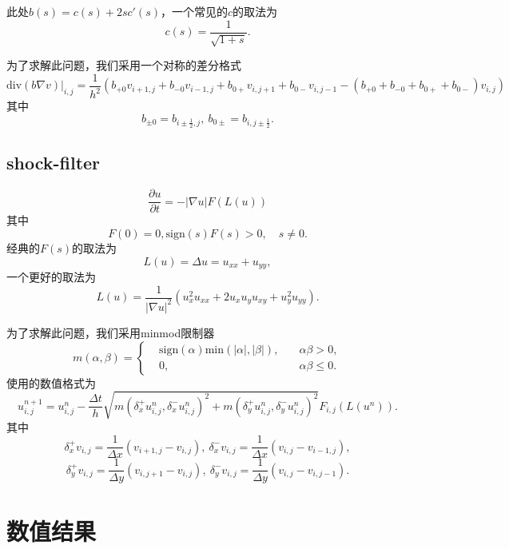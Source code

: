 \documentclass[a4paper,  11pt]{ctexart}
\newcommand\pd[2]{\dfrac{\partial {#1}}{\partial {#2}}}
\begin{document}
此处$b(s)=c(s)+2sc'(s)$，一个常见的$c$的取法为
\[ c(s) = \frac{1}{\sqrt{1+s}}. \]

为了求解此问题，我们采用一个对称的差分格式
\[
   \text{div} (b\nabla v)|_{i,j} = \frac{1}{h^2}\left(
   b_{+0}v_{i+1,j}+b_{-0}v_{i-1,j}+b_{0+}v_{i,j+1}+b_{0-}v_{i,j-1}
   -(b_{+0}+b_{-0}+b_{0+}+b_{0-})v_{i,j} \right)
\]
其中
\[
b_{\pm 0}=b_{i\pm \frac12,j},\ b_{0\pm}=b_{i,j\pm\frac12}.
\]
\subsection{shock-filter}
\begin{equation*}
	\pd{u}{t}=-|\nabla u|F(L(u))
\end{equation*}
其中
\[ F(0)=0, \text{sign}(s)F(s)>0,\quad s\neq 0. \]
经典的$F(s)$的取法为
\[ L(u) = \Delta u =u_{xx}+u_{yy}, \]
一个更好的取法为
\[ L(u) = \frac{1}{|\nabla
u|^2}(u_x^2u_{xx}+2u_xu_yu_{xy}+u_y^2u_{yy}). 
\]

为了求解此问题，我们采用minmod限制器
\[
m(\alpha,\beta)=\left\{
\begin{aligned}
    &\text{sign}(\alpha)\text{min}(|\alpha|,|\beta|),\quad
    &\alpha\beta>0, \\
    &0, & \alpha\beta\leq 0.
\end{aligned}
\right.
\]
使用的数值格式为
\[
u_{i,j}^{n+1}=u_{i,j}^n-\frac{\Delta t}{h}\sqrt{
m(\delta_x^+u_{i,j}^n,\delta_x^-u_{i,j}^n)^2
+m(\delta_y^+u_{i,j}^n,\delta_y^-u_{i,j}^n)^2
}F_{i,j}(L(u^n)).
\]
其中 
\[
\delta_x^+v_{i,j}=\frac{1}{\Delta x}(v_{i+1,j}-v_{i,j}), \ 
\delta_x^-v_{i,j}=\frac{1}{\Delta x}(v_{i,j}-v_{i-1,j}),
\]
\[
\delta_y^+v_{i,j}=\frac{1}{\Delta y}(v_{i,j+1}-v_{i,j}), \ 
\delta_y^-v_{i,j}=\frac{1}{\Delta y}(v_{i,j}-v_{i,j-1}).
\]

\section{数值结果}
\end{document}
